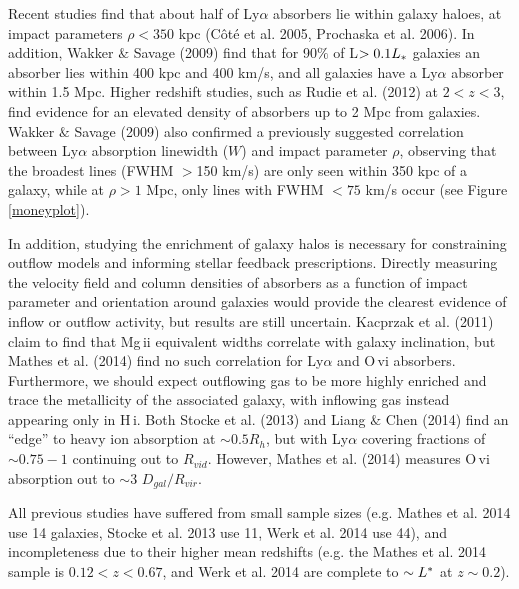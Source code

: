 \documentclass[iop]{emulateapj-rtx4}
\begin{document}
Recent studies find that about half of Ly$\alpha$ absorbers lie within galaxy haloes, at impact parameters $\rho<350$ kpc (C\^{o}t\'{e} et al. 2005, Prochaska et al. 2006). In addition, Wakker $\&$ Savage (2009) find that for 90$\%$ of L$>0.1L_{\**}$ galaxies an absorber lies within 400 kpc and 400 km/s, and all galaxies have a Ly$\alpha$ absorber within 1.5 Mpc. Higher redshift studies, such as Rudie et al. (2012) at $2<z<3$, find evidence for an elevated density of absorbers up to 2 Mpc from galaxies. Wakker $\&$ Savage (2009) also confirmed a previously suggested correlation between Ly$\alpha$ absorption linewidth ($W$) and impact parameter $\rho$, observing that the broadest lines (FWHM $>$150 km/s) are only seen within 350 kpc of a galaxy, while at $\rho>1$ Mpc, only lines with FWHM $<75$ km/s occur (see Figure \ref{moneyplot}).

In addition, studying the enrichment of galaxy halos is necessary for constraining outflow models and informing stellar feedback prescriptions. Directly measuring the velocity field and column densities of absorbers as a function of impact parameter and orientation around galaxies would provide the clearest evidence of inflow or outflow activity, but results are still uncertain. Kacprzak et al. (2011) claim to find that Mg\,{\sc ii} equivalent widths correlate with galaxy inclination, but Mathes et al. (2014) find no such correlation for Ly$\alpha$ and O\,{\sc vi} absorbers. Furthermore, we should expect outflowing gas to be more highly enriched and trace the metallicity of the associated galaxy, with inflowing gas instead appearing only in H\,{\sc i}. Both Stocke et al. (2013) and Liang $\&$ Chen (2014) find an ``edge'' to heavy ion absorption at $\sim0.5R_h$, but with Ly$\alpha$ covering fractions of $\sim0.75-1$ continuing out to $R_{vid}$. However, Mathes et al. (2014) measures O\,{\sc vi} absorption out to $\sim3$ $D_{gal}/R_{vir}$. 


All previous studies have suffered from small sample sizes (e.g. Mathes et al. 2014 use 14 galaxies, Stocke et al. 2013 use 11, Werk et al. 2014 use 44), and incompleteness due to their higher mean redshifts (e.g. the Mathes et al. 2014 sample is $0.12 <z<0.67$, and Werk et al. 2014 are complete to $\sim L^{\**}$ at $z\sim0.2$).
\end{document}
